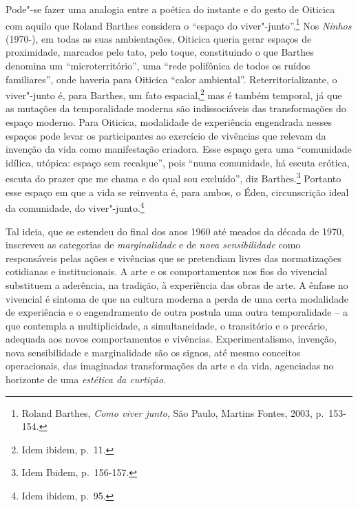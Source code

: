 Pode"-se fazer uma analogia entre a poética do instante e do gesto de
Oiticica com aquilo que Roland Barthes considera o ``espaço do
viver"-junto''.\footnote{Roland Barthes, \emph{Como viver junto}, São Paulo,
Martins Fontes, 2003, p.~153-154.} Nos \emph{Ninhos} (1970-), em todas as %
suas ambientações, Oiticica queria gerar espaços de proximidade,
marcados pelo tato, pelo toque, constituindo o que Barthes denomina um
``microterritório'', uma ``rede polifônica de todos os ruídos
familiares'', onde haveria para Oiticica ``calor ambiental''.
Reterritorializante, o viver"-junto é, para Barthes, um fato
espacial,\footnote{Idem ibidem, p.~11.} mas é também temporal, já que as mutações
da temporalidade moderna são indissociáveis das transformações do espaço
moderno. Para Oiticica, modalidade de experiência engendrada nesses
espaços pode levar os participantes ao exercício de vivências que
relevam da invenção da vida como manifestação criadora. Esse espaço gera
uma ``comunidade idílica, utópica: espaço sem recalque'', pois ``numa
comunidade, há escuta erótica, escuta do prazer que me chama e do qual
sou excluído'', diz Barthes.\footnote{Idem Ibidem, p.~156-157.} Portanto esse espaço em
que a vida se reinventa é, para ambos, o Éden, circunscrição ideal da
comunidade, do viver"-junto.\footnote{Idem ibidem, p.~95.}

Tal ideia, que se estendeu do final dos anos 1960 até meados da década
de 1970, inscreveu as categorias de \emph{marginalidade} e de \emph{nova
sensibilidade} como responsáveis pelas ações e vivências que se
pretendiam livres das normatizações cotidianas e institucionais. A arte
e os comportamentos nos fios do vivencial substituem a aderência, na
tradição, à experiência das obras de arte. A ênfase no vivencial é
sintoma de que na cultura moderna a perda de uma certa modalidade de
experiência e o engendramento de outra postula uma outra temporalidade
-- a que contempla a multiplicidade, a simultaneidade, o transitório e o
precário, adequada aos novos comportamentos e vivências.
Experimentalismo, invenção, nova sensibilidade e marginalidade são os
signos, até mesmo conceitos operacionais, das imaginadas transformações
da arte e da vida, agenciadas no horizonte de uma \emph{estética da
curtição.}

